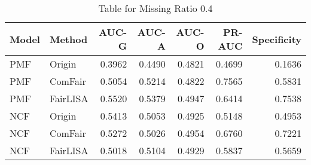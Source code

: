 \begin{table}
\centering
\caption{Table for Missing Ratio 0.4}
\label{tab:missing_0.4}
\begin{tabular}{llrrrrr}
\toprule
Model &   Method &  AUC-G &  AUC-A &  AUC-O &  PR-AUC &  Specificity \\
\midrule
  PMF &   Origin & 0.3962 & 0.4490 & 0.4821 &  0.4699 &       0.1636 \\
  PMF &  ComFair & 0.5054 & 0.5214 & 0.4822 &  0.7565 &       0.5831 \\
  PMF & FairLISA & 0.5520 & 0.5379 & 0.4947 &  0.6414 &       0.7538 \\
  NCF &   Origin & 0.5413 & 0.5053 & 0.4925 &  0.5148 &       0.4953 \\
  NCF &  ComFair & 0.5272 & 0.5026 & 0.4954 &  0.6760 &       0.7221 \\
  NCF & FairLISA & 0.5018 & 0.5104 & 0.4929 &  0.5837 &       0.5659 \\
\bottomrule
\end{tabular}
\end{table}
